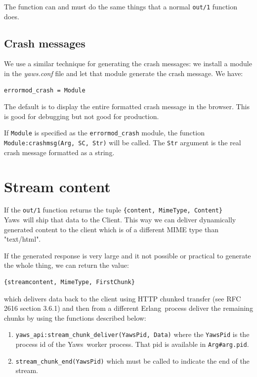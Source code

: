 \documentclass[11pt,oneside,english]{book}
\newcommand{\Erlang}            %
        {{\sc Erlang}}
\newcommand{\Yaws}            %
        {{\sc Yaws}}
\begin{document}
The function can and must do the same things that a normal
\verb+out/1+ function does.


\subsection{Crash messages}

We use a similar technique for generating the crash messages: we
install a module in the \textit{yaws.conf} file and let that module
generate the crash message.  We have:

\begin{verbatim}
errormod_crash = Module
\end{verbatim}

The default is to display the entire formatted crash message in the
browser.  This is good for debugging but not good for production.

If \verb+Module+ is specified as the \verb+errormod_crash+ module, the
function \verb+Module:crashmsg(Arg, SC, Str)+ will be called.  The
\verb+Str+ argument is the real crash message formatted as a string.

\section{Stream content}

If the \verb+out/1+ function returns the tuple
\verb+{content, MimeType, Content}+ \Yaws\ will ship that data to the
Client. This way we can deliver dynamically generated content to the
client which is of a different MIME type than "text/html".

If the generated response is very large and it not possible or
practical to generate the whole thing, we can return the value:

\begin{verbatim}
{streamcontent, MimeType, FirstChunk}
\end{verbatim}

\noindent which delivers data back to the client using HTTP chunked
transfer (see RFC 2616 section 3.6.1) and then from a different
\Erlang\ process deliver the remaining chunks by using the functions
described below:

\begin{enumerate}
\item \verb+yaws_api:stream_chunk_deliver(YawsPid, Data)+ where the
  \verb+YawsPid+ is the process id of the \Yaws\ worker process. That
  pid is available in \verb+Arg#arg.pid+.

\item \verb+stream_chunk_end(YawsPid)+ which must be called to
  indicate the end of the stream.
\end{enumerate}
\end{document}
